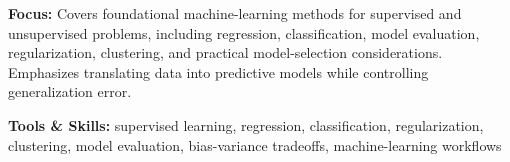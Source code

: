 \documentclass[9pt,letterpaper]{extarticle}
\begin{document}
\textbf{Focus:} Covers foundational machine-learning methods for supervised and unsupervised problems, including regression, classification, model evaluation, regularization, clustering, and practical model-selection considerations. Emphasizes translating data into predictive models while controlling generalization error.\par
{\small\textbf{Tools \& Skills:} supervised learning, regression, classification, regularization, clustering, model evaluation, bias-variance tradeoffs, machine-learning workflows\par}
\vspace{2pt}
\end{document}
